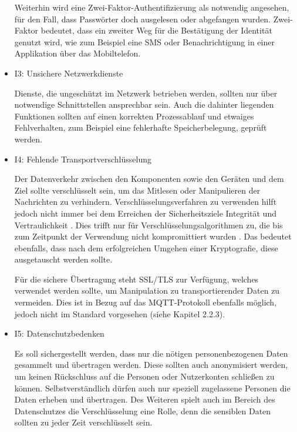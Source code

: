 \begin{itemize}
            Weiterhin wird eine Zwei-Faktor-Authentifizierung als notwendig angesehen, für den Fall, dass Passwörter doch ausgelesen oder abgefangen wurden. Zwei-Faktor bedeutet, dass ein zweiter Weg für die Bestätigung der Identität genutzt wird, wie zum Beispiel eine SMS oder Benachrichtigung in einer Applikation über das Mobiltelefon.
            
            \item I3: Unsichere Netzwerkdienste
            
            Dienste, die ungeschützt im Netzwerk betrieben werden, sollten nur über notwendige Schnittstellen ansprechbar sein.
            Auch die dahinter liegenden Funktionen sollten auf einen korrekten Prozessablauf und etwaiges Fehlverhalten, zum Beispiel eine fehlerhafte Speicherbelegung, geprüft werden.
            
            \item I4: Fehlende Transportverschlüsselung
            
            Der Datenverkehr zwischen den Komponenten sowie den Geräten und dem Ziel sollte verschlüsselt sein, um das Mitlesen oder Manipulieren der Nachrichten zu verhindern.
            Verschlüsselungsverfahren zu verwenden hilft jedoch nicht immer bei dem Erreichen der Sicherheitsziele Integrität und Vertraulichkeit \cite{Bedner2010}. Dies trifft nur für Verschlüsselungsalgorithmen zu, die bis zum Zeitpunkt der Verwendung nicht kompromittiert wurden \cite{bsi_2019}. Das bedeutet ebenfalls, dass nach dem erfolgreichen Umgehen einer Kryptografie, diese ausgetauscht werden sollte.
            
            Für die sichere Übertragung steht SSL/TLS zur Verfügung, welches verwendet werden sollte, um Manipulation zu transportierender Daten zu vermeiden. Dies ist in Bezug auf das \ac{MQTT}-Protokoll ebenfalls möglich, jedoch nicht im Standard vorgesehen (siehe Kapitel 2.2.3).
            
            \item I5: Datenschutzbedenken
            
            Es soll sichergestellt werden, dass nur die nötigen personenbezogenen Daten gesammelt und übertragen werden. Diese sollten auch anonymisiert werden, um keinen Rückschluss auf die Personen oder Nutzerkonten schließen zu können.
            Selbstverständlich dürfen auch nur speziell zugelassene Personen die Daten erheben und übertragen.
            Des Weiteren spielt auch im Bereich des Datenschutzes die Verschlüsselung eine Rolle, denn die sensiblen Daten sollten zu jeder Zeit verschlüsselt sein.
    

\end{itemize}
